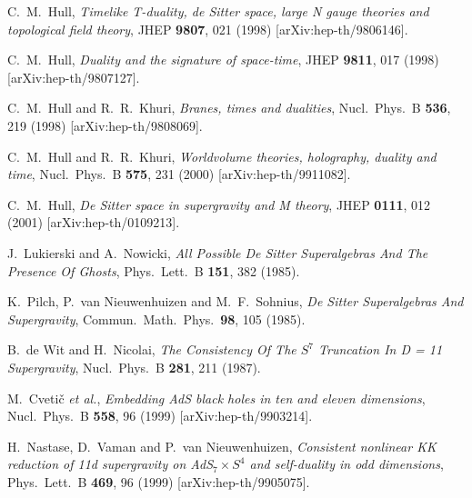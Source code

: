 \documentclass[a4paper,12pt]{article}
\begin{document}
\begin{thebibliography}{99}

C.~M.~Hull,
{\sl Timelike T-duality, de Sitter space, large N gauge theories and
topological field theory},
JHEP {\bf 9807}, 021 (1998) [arXiv:hep-th/9806146].

C.~M.~Hull,
{\sl Duality and the signature of space-time},
JHEP {\bf 9811}, 017 (1998) [arXiv:hep-th/9807127].

C.~M.~Hull and R.~R.~Khuri,
{\sl Branes, times and dualities},
Nucl.\ Phys.\ B {\bf 536}, 219 (1998) [arXiv:hep-th/9808069].

C.~M.~Hull and R.~R.~Khuri,
{\sl Worldvolume theories, holography, duality and time},
Nucl.\ Phys.\ B {\bf 575}, 231 (2000) [arXiv:hep-th/9911082].

C.~M.~Hull,
{\sl De Sitter space in supergravity and M theory},
JHEP {\bf 0111}, 012 (2001) [arXiv:hep-th/0109213].

J.~Lukierski and A.~Nowicki,
{\sl All Possible De Sitter Superalgebras And The Presence Of Ghosts},
Phys.\ Lett.\ B {\bf 151}, 382 (1985).

K.~Pilch, P.~van Nieuwenhuizen and M.~F.~Sohnius,
{\sl De Sitter Superalgebras And Supergravity},
Commun.\ Math.\ Phys.\  {\bf 98}, 105 (1985).

B.~de Wit and H.~Nicolai,
{\sl The Consistency Of The $S^7$ Truncation In D = 11 Supergravity},
Nucl.\ Phys.\ B {\bf 281}, 211 (1987).

M.~Cveti\v{c} {\it et al.},
{\sl Embedding AdS black holes in ten and eleven dimensions},
Nucl.\ Phys.\ B {\bf 558}, 96 (1999) [arXiv:hep-th/9903214].

H.~Nastase, D.~Vaman and P.~van Nieuwenhuizen,
{\sl Consistent nonlinear KK reduction of 11d supergravity on
AdS$_7\times S^4$ and self-duality in odd dimensions},
Phys.\ Lett.\ B {\bf 469}, 96 (1999) [arXiv:hep-th/9905075].


\end{thebibliography}
\end{document}
